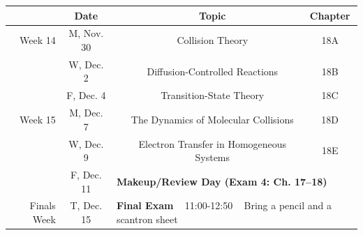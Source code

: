 \documentclass[12pt, letterpaper]{article}
\begin{document}
\begin{tabular}{rcccc}
	            & Date       &                                                                                             & Topic                                    & Chapter \\
	\midrule
	Week 14     & M, Nov. 30 &                                                                                             & Collision Theory                         & 18A     \\
	            & W, Dec. 2  &                                                                                             & Diffusion-Controlled Reactions           & 18B     \\
	            & F, Dec. 4  &                                                                                             & Transition-State Theory                  & 18C     \\
	\midrule
	Week 15     & M, Dec. 7  &                                                                                             & The Dynamics of Molecular Collisions     & 18D     \\
	            & W, Dec. 9  &                                                                                             & Electron Transfer in Homogeneous Systems & 18E     \\
	            & F, Dec. 11 & \multicolumn{3}{l}{\textbf{Makeup/Review Day (Exam 4: Ch. 17--18)}}                                                                              \\
	\midrule
	\midrule
	Finals Week & T, Dec. 15 & \multicolumn{3}{l}{\textbf{Final Exam} ~ 11:00-12:50 ~ Bring a pencil and a scantron sheet}                                                      \\
\end{tabular}
\end{document}
